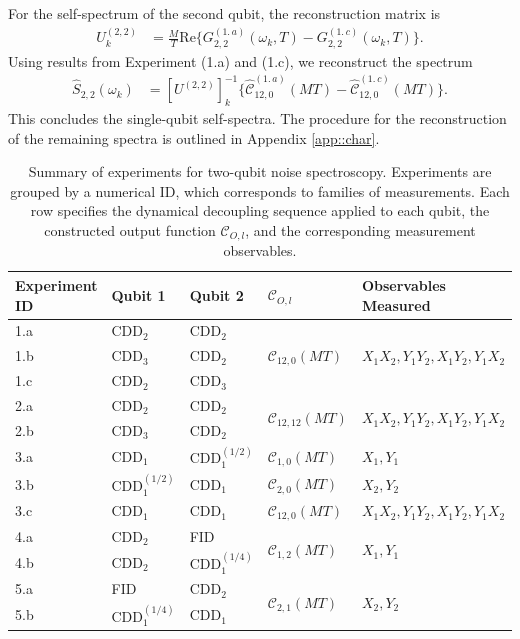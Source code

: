 \documentclass[%
 reprint,
superscriptaddress,
 amsmath,amssymb,
 aps,
pra,
]{revtex4-2}
\begin{document}
For the self-spectrum of the second qubit, the reconstruction matrix is
\begin{align}
    U_{k}^{(2,2)}&=\frac{M}{T}\text{Re}\Big\{G_{2,2}^{(1.\,a)}(\omega_k, T) - G_{2,2}^{(1.\,c)}(\omega_k, T)\Big\}.
\end{align}
Using results from Experiment (1.a) and (1.c), we reconstruct the spectrum
\begin{align}
    \hat{S}_{2,2}(\omega_k) &= [U^{(2,2)}]^{-1}_{k}\Big\{\hat{\mathcal{C}}_{12,0}^{(1.\,a)}(MT) - \hat{\mathcal{C}}_{12,0}^{(1.\,c)}(MT)\Big\}.
\end{align}
This concludes the single-qubit self-spectra. The procedure for the reconstruction of the remaining spectra is outlined in Appendix \ref{app::char}.
\begin{table}[h]
    \centering
    \caption{Summary of experiments for two-qubit noise spectroscopy. Experiments are grouped by a numerical ID, which corresponds to families of measurements. Each row specifies the dynamical decoupling sequence applied to each qubit, the constructed output function $\mathcal{C}_{O,l}$, and the corresponding measurement observables.}
    \label{tab:exps}
    \begin{tabular}{@{}lllll@{}}
        \toprule
        \textbf{Experiment ID} & \textbf{Qubit 1} & \textbf{Qubit 2} & \textbf{$\mathcal{C}_{O,l}$} & \textbf{Observables Measured} \\
        \midrule
        1.a & $\text{CDD}_2$ & $\text{CDD}_2$ & \multirow{3}{*}{$\mathcal{C}_{12,0}(MT)$} & \multirow{3}{*}{$X_1X_2, Y_1Y_2, X_1Y_2, Y_1X_2$} \\
        1.b & $\text{CDD}_3$ & $\text{CDD}_2$ & & \\
        1.c & $\text{CDD}_2$ & $\text{CDD}_3$ & & \\
        \midrule
        2.a & $\text{CDD}_2$ & $\text{CDD}_2$ & \multirow{2}{*}{$\mathcal{C}_{12,12}(MT)$} & \multirow{2}{*}{$X_1X_2, Y_1Y_2, X_1Y_2, Y_1X_2$} \\
        2.b & $\text{CDD}_3$ & $\text{CDD}_2$ & & \\
        \midrule
        3.a & $\text{CDD}_1$ & $\text{CDD}_1^{(1/2)}$ & $\mathcal{C}_{1,0}(MT)$ & $X_1, Y_1$ \\
        3.b & $\text{CDD}_1^{(1/2)}$ & $\text{CDD}_1$ & $\mathcal{C}_{2,0}(MT)$ & $X_2, Y_2$ \\
        3.c & $\text{CDD}_1$ & $\text{CDD}_1$ & $\mathcal{C}_{12,0}(MT)$ & $X_1X_2, Y_1Y_2, X_1Y_2, Y_1X_2$ \\
        \midrule
        4.a & $\text{CDD}_2$ & FID & \multirow{2}{*}{$\mathcal{C}_{1,2}(MT)$} & \multirow{2}{*}{$X_1, Y_1$} \\
        4.b & $\text{CDD}_2$ & $\text{CDD}_1^{(1/4)}$ & & \\
        \midrule
        5.a & FID & $\text{CDD}_2$ & \multirow{2}{*}{$\mathcal{C}_{2,1}(MT)$} & \multirow{2}{*}{$X_2, Y_2$} \\
        5.b & $\text{CDD}_1^{(1/4)}$ & $\text{CDD}_1$ & & \\
        \bottomrule
    \end{tabular}
\end{table}
\end{document}
